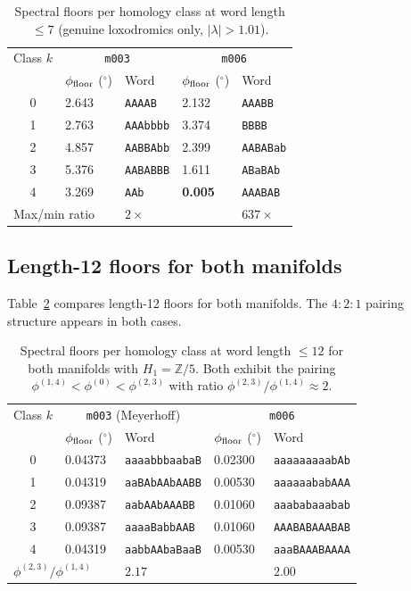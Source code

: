\documentclass[12pt,a4paper]{article}
\newcommand{\mfld}[1]{\texttt{#1}}
\newcommand{\word}[1]{\texttt{#1}}
\newcommand{\degr}{^{\circ}}
\begin{document}
\begin{table}[tp]
\caption{Spectral floors per homology class at word length $\leq 7$
  (genuine loxodromics only, $|\lambda|>1.01$).}
\label{tab:floors_L7}
\begin{tabular}{cllll}
\toprule
Class $k$ & \multicolumn{2}{c}{\mfld{m003}} &
            \multicolumn{2}{c}{\mfld{m006}} \\
          & $\phi_{\rm floor}$ ($\degr$) & Word
          & $\phi_{\rm floor}$ ($\degr$) & Word \\
\midrule
0 & 2.643 & \word{AAAAB}   & 2.132 & \word{AAABB}   \\
1 & 2.763 & \word{AAAbbbb} & 3.374 & \word{BBBB}    \\
2 & 4.857 & \word{AABBAbb} & 2.399 & \word{AABABab} \\
3 & 5.376 & \word{AABABBB} & 1.611 & \word{ABaBAb}  \\
4 & 3.269 & \word{AAb}     & \textbf{0.005} & \word{AAABAB}  \\
\midrule
\multicolumn{2}{l}{Max/min ratio} & $2\times$
& & $637\times$ \\
\bottomrule
\end{tabular}
\end{table}

\subsection{Length-12 floors for both manifolds}

Table~\ref{tab:floors_both_L12} compares length-12 floors for both
manifolds.  The $4:2:1$ pairing structure appears in both cases.

\begin{table}[tp]
\caption{Spectral floors per homology class at word length $\leq 12$
  for both manifolds with $H_1=\mathbb{Z}/5$.
  Both exhibit the pairing $\phi^{(1,4)}<\phi^{(0)}<\phi^{(2,3)}$
  with ratio $\phi^{(2,3)}/\phi^{(1,4)}\approx 2$.}
\label{tab:floors_both_L12}
\begin{tabular}{cllll}
\toprule
Class $k$ & \multicolumn{2}{c}{\mfld{m003} (Meyerhoff)} &
            \multicolumn{2}{c}{\mfld{m006}} \\
          & $\phi_{\rm floor}$ ($\degr$) & Word
          & $\phi_{\rm floor}$ ($\degr$) & Word \\
\midrule
0 & 0.04373 & \word{aaaabbbaabaB} & 0.02300 & \word{aaaaaaaaabAb} \\
1 & 0.04319 & \word{aaBAbAAbAABB} & 0.00530 & \word{aaaaaababAAA} \\
2 & 0.09387 & \word{aabAAbAAABB}  & 0.01060 & \word{aaababaaabab} \\
3 & 0.09387 & \word{aaaaBabbAAB}  & 0.01060 & \word{AAABABAAABAB} \\
4 & 0.04319 & \word{aabbAAbaBaaB} & 0.00530 & \word{aaaBAAABAAAA} \\
\midrule
\multicolumn{2}{l}{$\phi^{(2,3)}/\phi^{(1,4)}$} & $2.17$ &
  & $2.00$ \\
\bottomrule
\end{tabular}
\end{table}
\end{document}
